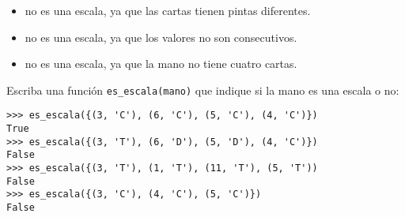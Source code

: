 \documentclass[10pt,spanish]{article}
\newcommand{\cv}{\texttt}
\begin{document}
\begin{enumerate}
\begin{itemize}
        \item
          \fbox{\cv{3}\(\clubsuit\)}
          \fbox{\cv{6}\(\diamondsuit\)}
          \fbox{\cv{5}\(\diamondsuit\)}
          \fbox{\cv{4}\(\heartsuit\)}
          no es una escala, ya que las cartas tienen pintas diferentes.

        \item
          \fbox{\cv{3}\(\clubsuit\)}
          \fbox{\cv{A}\(\clubsuit\)}
          \fbox{\cv{J}\(\clubsuit\)}
          \fbox{\cv{5}\(\clubsuit\)}
          no es una escala, ya que los valores no son consecutivos.

        \item
          \fbox{\cv{3}\(\spadesuit\)}
          \fbox{\cv{4}\(\spadesuit\)}
          \fbox{\cv{5}\(\spadesuit\)}
          no es una escala, ya que la mano no tiene cuatro cartas.
      \end{itemize}

      Escriba una función \lstinline!es_escala(mano)!
      que indique si la mano es una escala o no:
      \begin{lstlisting}
>>> es_escala({(3, 'C'), (6, 'C'), (5, 'C'), (4, 'C')})
True
>>> es_escala({(3, 'T'), (6, 'D'), (5, 'D'), (4, 'C')})
False
>>> es_escala({(3, 'T'), (1, 'T'), (11, 'T'), (5, 'T'))
False
>>> es_escala({(3, 'C'), (4, 'C'), (5, 'C')})
False
      \end{lstlisting}

      \framebox[\textwidth]{\rule[50.0ex]{0pt}{0pt}}







  \end{enumerate}
\end{document}
